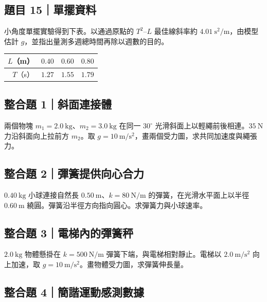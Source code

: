 \documentclass[11pt,a4paper]{article}
\newcounter{none}
\begin{document}
\subsection{題目 15｜單擺資料}\label{ux984cux76ee-15ux55aeux64faux8cc7ux6599}

小角度單擺實驗得到下表。以通過原點的 \(T^2\)--\(L\) 最佳線斜率約 \(4.01\ \mathrm{s^2/m}\)，由模型估計 \(g\)，並指出量測多週總時間再除以週數的目的。

{\def\LTcaptype{none} %
\begin{longtable}[]{@{}rrrr@{}}
\toprule\noalign{}
\(L\)（m） & \(0.40\) & \(0.60\) & \(0.80\) \\
\midrule\noalign{}
\endhead
\bottomrule\noalign{}
\endlastfoot
\(T\)（s） & \(1.27\) & \(1.55\) & \(1.79\) \\
\end{longtable}
}

\subsection{整合題 1｜斜面連接體}\label{ux6574ux5408ux984c-1ux659cux9762ux9023ux63a5ux9ad4}

兩個物塊 \(m_1=2.0\ \mathrm{kg}\)、\(m_2=3.0\ \mathrm{kg}\) 在同一 \(30^\circ\) 光滑斜面上以輕繩前後相連。\(35\ \mathrm N\) 力沿斜面向上拉前方 \(m_2\)。取 \(g=10\ \mathrm{m/s^2}\)，畫兩個受力圖，求共同加速度與繩張力。

\subsection{整合題 2｜彈簧提供向心合力}\label{ux6574ux5408ux984c-2ux5f48ux7c27ux63d0ux4f9bux5411ux5fc3ux5408ux529b}

\(0.40\ \mathrm{kg}\) 小球連接自然長 \(0.50\ \mathrm m\)、\(k=80\ \mathrm{N/m}\) 的彈簧，在光滑水平面上以半徑 \(0.60\ \mathrm m\) 繞圓。彈簧沿半徑方向指向圓心。求彈簧力與小球速率。

\subsection{整合題 3｜電梯內的彈簧秤}\label{ux6574ux5408ux984c-3ux96fbux68afux5167ux7684ux5f48ux7c27ux79e4}

\(2.0\ \mathrm{kg}\) 物體懸掛在 \(k=500\ \mathrm{N/m}\) 彈簧下端，與電梯相對靜止。電梯以 \(2.0\ \mathrm{m/s^2}\) 向上加速，取 \(g=10\ \mathrm{m/s^2}\)。畫物體受力圖，求彈簧伸長量。

\subsection{整合題 4｜簡諧運動感測數據}\label{ux6574ux5408ux984c-4ux7c21ux8ae7ux904bux52d5ux611fux6e2cux6578ux64da}
\end{document}
